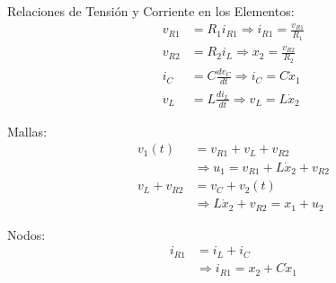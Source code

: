   Relaciones de Tensión y Corriente en los Elementos:
  \begin{align}
    v_{R1} &= R_1 i_{R1} \Rightarrow i_{R1} = \frac{v_{R1}}{R_1}
    \label{eq:1.2:3:vr1}
    \\
    v_{R2} &= R_2 i_L \Rightarrow x_2 = \frac{v_{R2}}{R_2}
    \label{eq:1.2:3:vr2}
    \\
    i_C &= C \frac{dv_{C}}{dt} \Rightarrow i_C = C\dot{x}_1
    \label{eq:1.2:3:ic}
    \\
    v_L &= L \frac{di_L}{dt} \Rightarrow v_L = L\dot{x}_2
    \label{eq:1.2:3:vl}
  \end{align}

  Mallas:
  \begin{align}
    v_1(t) &= v_{R1} + v_L + v_{R2} \nonumber \\
    \tag{Malla 1}
    &\Rightarrow
    u_1 = v_{R1} + L \dot{x}_2 + v_{R2}
    \label{eq:1.2:3:Malla1}
    \\
    v_L + v_{R2} &= v_C +  v_2(t) \nonumber \\
    \tag{Malla 2}
    &\Rightarrow
    L \dot{x}_2 + v_{R2} = x_1 + u_2
    \label{eq:1.2:3:Malla2}
  \end{align}

  Nodos:
  \begin{align}
    i_{R1} &= i_L + i_C \nonumber \\
    \tag{Nodo 1}
    &\Rightarrow i_{R1} = x_2 + C \dot{x}_1
    \label{eq:1.2:3:Nodo1}
  \end{align}
